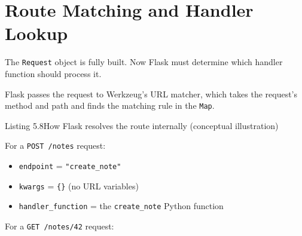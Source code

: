 \setcounter{section}{4}
\section{Route Matching and Handler Lookup}\label{05-internal-request-execution:55-route-matching-and-handler-lookup}

The \texttt{Request} object is fully built. Now Flask must determine which handler function should process it.

Flask passes the request to Werkzeug's URL matcher, which takes the request's method and path and finds the matching rule in the \texttt{Map}.

\begin{codeboxcap}[short]{\textcolor{accent}{Listing 5.8}\enspace How Flask resolves the route internally (conceptual illustration)}

\begin{Shaded}
\begin{Highlighting}[]
\OperatorTok{=}
\OperatorTok{=}\OperatorTok{=}

\OperatorTok{=}
\end{Highlighting}
\end{Shaded}

\end{codeboxcap}

\noindent{}For a \texttt{POST\ /notes} request:

\begin{itemize}
\tightlist
\item
  \texttt{endpoint} = \texttt{"create\_note"}
\item
  \texttt{kwargs} = \texttt{\{\}} (no URL variables)
\item
  \texttt{handler\_function} = the \texttt{create\_note} Python function
\end{itemize}

\noindent{}For a \texttt{GET\ /notes/42} request:

